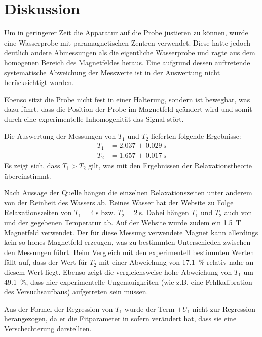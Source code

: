 \section{Diskussion}
\label{sec:Diskussion}

Um in geringerer Zeit die Apparatur auf die Probe justieren zu können,
wurde eine Wasserprobe mit paramagnetischen Zentren verwendet.
Diese hatte jedoch deutlich andere Abmessungen als die eigentliche Wasserprobe
und ragte aus dem homogenen Bereich des Magnetfeldes heraus.
Eine aufgrund dessen auftretende systematische Abweichung der Messwerte ist in der
Auswertung nicht berücksichtigt worden.

Ebenso sitzt die Probe nicht fest in einer Halterung, sondern ist bewegbar, was
dazu führt, dass die Position der Probe im Magnetfeld geändert wird und somit durch
eine experimentelle Inhomogenität das Signal stört.


Die Auswertung der Messungen von $T_1$ und $T_2$ lieferten folgende Ergebnisse:
\begin{align*}
  T_1 &= \SI{2.037(29)}{\second} \\
  T_2 &= \SI{1.657(17)}{\second}
\end{align*}
Es zeigt sich, dass $T_1 > T_2$ gilt, was mit den Ergebnissen der Relaxationstheorie
übereinstimmt.

Nach Aussage der Quelle \cite{QAMRI} hängen die einzelnen Relaxationszeiten
unter anderem von der Reinheit des Wassers ab.
Reines Wasser hat der Website zu Folge Relaxationszeiten von
$T_1 = \SI{4}{\second}$ bzw. $T_2 = \SI{2}{\second}$. Dabei hängen $T_1$ und $T_2$
auch von {} und der gegebenen Temperatur ab. Auf der Website
wurde zudem ein \SI{1.5}{\tesla} Magnetfeld verwendet. Der für diese Messung verwendete
Magnet kann allerdings kein so hohes Magnetfeld erzeugen, was zu bestimmten Unterschieden
zwischen den Messungen führt.
Beim Vergleich mit den experimentell bestimmten Werten fällt auf, dass der
Wert für $T_2$ mit einer Abweichung von \SI{17.1}{\percent} relativ
nahe an diesem Wert liegt.
Ebenso zeigt die vergleichsweise hohe Abweichung von $T_1$ um \SI{49.1}{\percent},
dass hier experimentelle Ungenauigkeiten (wie z.B. eine Fehlkalibration des
Versuchsaufbaus) aufgetreten sein müssen.

Aus der Formel der Regression von $T_1$ wurde der Term $+ U_1$ nicht zur Regression
herangezogen, da er die Fitparameter in sofern verändert hat, dass sie eine
Verschechterung darstellten.

